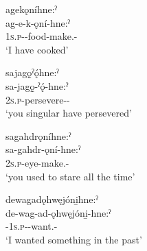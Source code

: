 \ex agekǫníhne:ˀ\\
\gll ag-e-k-ǫní-hne:ˀ\\
 \textsc{1s.p}-{\joinerE}-food-make.{\stative}-{\remote}\\
\glt `I have cooked'


\ex sajagǫ̱ˀǫ́hne:ˀ\\
\gll sa-jagǫ̱-ˀǫ́-hne:ˀ\\
 \textsc{2s.p}-persevere-{\stative}-{\remote}\\
\glt `you singular have persevered'


\ex sagahdrǫníhne:ˀ\\
\gll sa-gahdr-ǫní-hne:ˀ\\
 \textsc{2s.p}-eye-make.{\stative}-{\remote}\\
\glt `you used to stare all the time'


\ex dewagadǫhwęjóni̱hne:ˀ\\
\gll de-wag-ad-ǫhwęjóni̱-hne:ˀ\\
 {\dualic}-\textsc{1s.p}-{\semireflexive}-want.{\stative}-{\remote}\\
\glt `I wanted something in the past'

\z
\z

